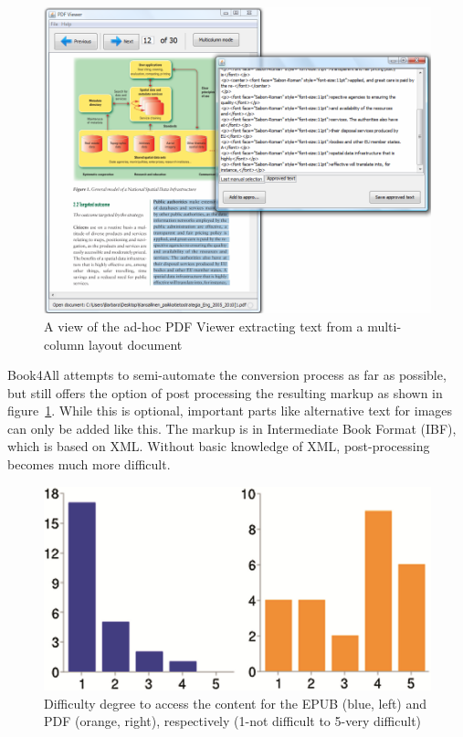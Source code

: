 \begin{figure}[H]
	\includegraphics[width=\linewidth]{figures/book4all1.png}
	\caption{A view of the ad-hoc PDF Viewer extracting text from a multi-column layout document \protect\cite{book4all}}
	\label{fig:book4all1}
\end{figure}

Book4All attempts to semi-automate the conversion process as far as possible, but still offers the option of post processing the resulting markup as shown in figure~\ref{fig:book4all1}. While this is optional, important parts like alternative text for images can only be added like this. The markup is in Intermediate Book Format (IBF), which is based on XML. Without basic knowledge of XML, post-processing becomes much more difficult. 

\begin{figure}[H]
	\centering
	\includegraphics[width=\linewidth*4/5]{figures/easeOfContentAccess.png}
	\caption{Difficulty degree to access the content for the EPUB (blue, left) and PDF (orange, right), respectively (1-not difficult
		to 5-very difficult) \protect\cite{enrichEPUB}} 
	\label{fig:enrichEpub1}
\end{figure}

